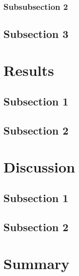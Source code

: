 \subsubsection{Subsubsection 2}
\label{subsubsec:subsubsec-2}

\lipsum[6]

\subsection{Subsection 3}
\label{subsec:subsec3}

\lipsum[3]


\section{Results}
\label{sec:results}

\lipsum[2]

\subsection{Subsection 1}
\label{subsec:subsec12}

\lipsum[3-6]

\subsection{Subsection 2}
\label{subsec:subsec13}

\lipsum[7-10]


\section{Discussion}
\label{sec:discussion}

\lipsum[1-2]

\subsection{Subsection 1}
\label{subsec:subsec123}

\lipsum[2-3]

\subsection{Subsection 2}
\label{subsec:subsec134}

\lipsum[11-12]


\section{Summary}
\label{sec:summary}

\lipsum[1-3]
